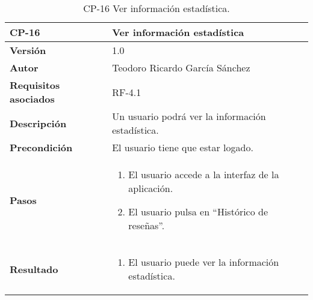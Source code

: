 \begin{table}[p]
	\centering
	\begin{tabularx}{\linewidth}{ p{} p{} }
		\toprule
		\textbf{CP-16}    & \textbf{Ver información estadística}\\
		\toprule
		\textbf{Versión}              & 1.0    \\
		\textbf{Autor}                & Teodoro Ricardo García Sánchez \\
		\textbf{Requisitos asociados} & RF-4.1 \\
		\textbf{Descripción}          & Un usuario podrá ver la información estadística. \\
		\textbf{Precondición}         & El usuario tiene que estar logado. \\
		\textbf{Pasos}             &
		\begin{enumerate}
			\def\labelenumi{\arabic{enumi}.}
			\tightlist
			\item El usuario accede a la interfaz de la aplicación.
			\item El usuario pulsa en ``Histórico de reseñas''.
		\end{enumerate}\\
		\textbf{Resultado}          & 
		\begin{enumerate}
			\item El usuario puede ver la información estadística.
		\end{enumerate}\\
		\bottomrule
	\end{tabularx}
	\caption{CP-16 Ver información estadística.}
\end{table}


